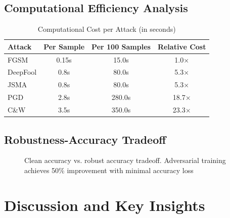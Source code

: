 \documentclass[10pt,conference]{IEEEtran}
\begin{document}
\subsection{Computational Efficiency Analysis}

\begin{table}[H]
\centering
\caption{Computational Cost per Attack (in seconds)}
\label{tab:computation}
\begin{tabular}{lccc}
\toprule
\textbf{Attack} & \textbf{Per Sample} & \textbf{Per 100 Samples} & \textbf{Relative Cost} \\
\midrule
FGSM & 0.15s & 15.0s & 1.0× \\
DeepFool & 0.8s & 80.0s & 5.3× \\
JSMA & 0.8s & 80.0s & 5.3× \\
PGD & 2.8s & 280.0s & 18.7× \\
C\&W & 3.5s & 350.0s & 23.3× \\
\toprule
\end{tabular}
\end{table}

\subsection{Robustness-Accuracy Tradeoff}

\begin{figure}[H]
\centering
{}
\caption{Clean accuracy vs. robust accuracy tradeoff. Adversarial training achieves 50\% improvement with minimal accuracy loss}
\label{fig:tradeoff}
\end{figure}

\section{Discussion and Key Insights}
\end{document}
